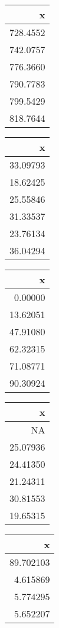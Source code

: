 \documentclass{article}
\begin{document}
\begin{table}[]
\centering\begin{table}

\centering
\begin{tabular}[t]{r}
\hline
x\\
\hline
728.4552\\
\hline
742.0757\\
\hline
776.3660\\
\hline
790.7783\\
\hline
799.5429\\
\hline
818.7644\\
\hline
\end{tabular}
\centering
\begin{tabular}[t]{r}
\hline
x\\
\hline
33.09793\\
\hline
18.62425\\
\hline
25.55846\\
\hline
31.33537\\
\hline
23.76134\\
\hline
36.04294\\
\hline
\end{tabular}
\centering
\begin{tabular}[t]{r}
\hline
x\\
\hline
0.00000\\
\hline
13.62051\\
\hline
47.91080\\
\hline
62.32315\\
\hline
71.08771\\
\hline
90.30924\\
\hline
\end{tabular}
\centering
\begin{tabular}[t]{r}
\hline
x\\
\hline
NA\\
\hline
25.07936\\
\hline
24.41350\\
\hline
21.24311\\
\hline
30.81553\\
\hline
19.65315\\
\hline
\end{tabular}
\centering
\begin{tabular}[t]{r}
\hline
x\\
\hline
89.702103\\
\hline
4.615869\\
\hline
5.774295\\
\hline
5.652207\\

\end{tabular}
\end{table}
\end{table}
\end{document}
